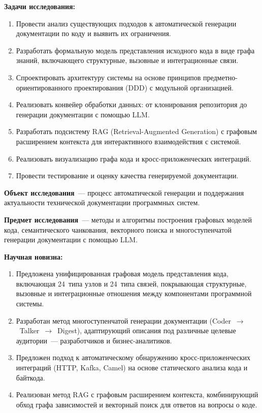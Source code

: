 \textbf{Задачи исследования:}
\begin{enumerate}
  \item Провести анализ существующих подходов к автоматической генерации документации по коду и выявить их ограничения.
  \item Разработать формальную модель представления исходного кода в виде графа знаний, включающего структурные, вызовные и интеграционные связи.
  \item Спроектировать архитектуру системы на основе принципов предметно-ориентированного проектирования (DDD) с модульной организацией.
  \item Реализовать конвейер обработки данных: от клонирования репозитория до генерации документации с помощью LLM.
  \item Разработать подсистему RAG (Retrieval-Augmented Generation) с графовым расширением контекста для интерактивного взаимодействия с системой.
  \item Реализовать визуализацию графа кода и кросс-приложенческих интеграций.
  \item Провести тестирование и оценку качества генерируемой документации.
\end{enumerate}

\textbf{Объект исследования}~--- процесс автоматической генерации и поддержания актуальности технической документации программных систем.

\textbf{Предмет исследования}~--- методы и алгоритмы построения графовых моделей кода, семантического чанкования, векторного поиска и многоступенчатой генерации документации с помощью LLM.

\textbf{Научная новизна:}
\begin{enumerate}
  \item Предложена унифицированная графовая модель представления кода, включающая 24~типа узлов и 24~типа связей, покрывающая структурные, вызовные и интеграционные отношения между компонентами программной системы.
  \item Разработан метод многоступенчатой генерации документации (Coder~$\to$~Talker~$\to$~Digest), адаптирующий описания под различные целевые аудитории~--- разработчиков и бизнес-аналитиков.
  \item Предложен подход к автоматическому обнаружению кросс-приложенческих интеграций (HTTP, Kafka, Camel) на основе статического анализа кода и байткода.
  \item Реализован метод RAG с графовым расширением контекста, комбинирующий обход графа зависимостей и векторный поиск для ответов на вопросы о коде.
\end{enumerate}

